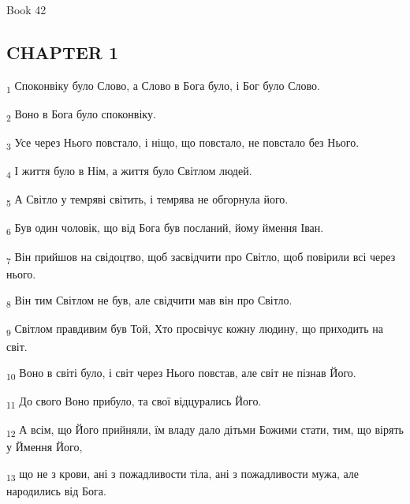 Book 42
\subsection{CHAPTER 1}
\begin{tcolorbox}
\textsubscript{1} Споконвіку було Слово, а Слово в Бога було, і Бог було Слово.
\end{tcolorbox}
\begin{tcolorbox}
\textsubscript{2} Воно в Бога було споконвіку.
\end{tcolorbox}
\begin{tcolorbox}
\textsubscript{3} Усе через Нього повстало, і ніщо, що повстало, не повстало без Нього.
\end{tcolorbox}
\begin{tcolorbox}
\textsubscript{4} І життя було в Нім, а життя було Світлом людей.
\end{tcolorbox}
\begin{tcolorbox}
\textsubscript{5} А Світло у темряві світить, і темрява не обгорнула його.
\end{tcolorbox}
\begin{tcolorbox}
\textsubscript{6} Був один чоловік, що від Бога був посланий, йому ймення Іван.
\end{tcolorbox}
\begin{tcolorbox}
\textsubscript{7} Він прийшов на свідоцтво, щоб засвідчити про Світло, щоб повірили всі через нього.
\end{tcolorbox}
\begin{tcolorbox}
\textsubscript{8} Він тим Світлом не був, але свідчити мав він про Світло.
\end{tcolorbox}
\begin{tcolorbox}
\textsubscript{9} Світлом правдивим був Той, Хто просвічує кожну людину, що приходить на світ.
\end{tcolorbox}
\begin{tcolorbox}
\textsubscript{10} Воно в світі було, і світ через Нього повстав, але світ не пізнав Його.
\end{tcolorbox}
\begin{tcolorbox}
\textsubscript{11} До свого Воно прибуло, та свої відцурались Його.
\end{tcolorbox}
\begin{tcolorbox}
\textsubscript{12} А всім, що Його прийняли, їм владу дало дітьми Божими стати, тим, що вірять у Ймення Його,
\end{tcolorbox}
\begin{tcolorbox}
\textsubscript{13} що не з крови, ані з пожадливости тіла, ані з пожадливости мужа, але народились від Бога.
\end{tcolorbox}
